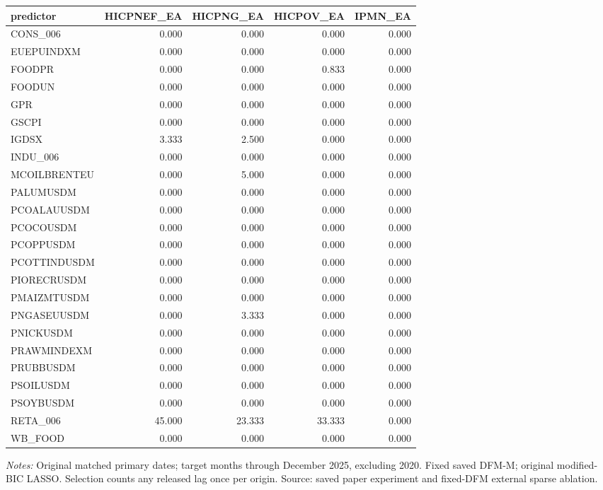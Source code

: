 \begin{threeparttable}
\begin{tabular}{lrrrr}
\toprule
predictor & HICPNEF\_EA & HICPNG\_EA & HICPOV\_EA & IPMN\_EA \\
\midrule
CONS\_006 & 0.000 & 0.000 & 0.000 & 0.000 \\
EUEPUINDXM & 0.000 & 0.000 & 0.000 & 0.000 \\
FOODPR & 0.000 & 0.000 & 0.833 & 0.000 \\
FOODUN & 0.000 & 0.000 & 0.000 & 0.000 \\
GPR & 0.000 & 0.000 & 0.000 & 0.000 \\
GSCPI & 0.000 & 0.000 & 0.000 & 0.000 \\
IGDSX & 3.333 & 2.500 & 0.000 & 0.000 \\
INDU\_006 & 0.000 & 0.000 & 0.000 & 0.000 \\
MCOILBRENTEU & 0.000 & 5.000 & 0.000 & 0.000 \\
PALUMUSDM & 0.000 & 0.000 & 0.000 & 0.000 \\
PCOALAUUSDM & 0.000 & 0.000 & 0.000 & 0.000 \\
PCOCOUSDM & 0.000 & 0.000 & 0.000 & 0.000 \\
PCOPPUSDM & 0.000 & 0.000 & 0.000 & 0.000 \\
PCOTTINDUSDM & 0.000 & 0.000 & 0.000 & 0.000 \\
PIORECRUSDM & 0.000 & 0.000 & 0.000 & 0.000 \\
PMAIZMTUSDM & 0.000 & 0.000 & 0.000 & 0.000 \\
PNGASEUUSDM & 0.000 & 3.333 & 0.000 & 0.000 \\
PNICKUSDM & 0.000 & 0.000 & 0.000 & 0.000 \\
PRAWMINDEXM & 0.000 & 0.000 & 0.000 & 0.000 \\
PRUBBUSDM & 0.000 & 0.000 & 0.000 & 0.000 \\
PSOILUSDM & 0.000 & 0.000 & 0.000 & 0.000 \\
PSOYBUSDM & 0.000 & 0.000 & 0.000 & 0.000 \\
RETA\_006 & 45.000 & 23.333 & 33.333 & 0.000 \\
WB\_FOOD & 0.000 & 0.000 & 0.000 & 0.000 \\
\bottomrule
\end{tabular}
\begin{tablenotes}[flushleft]\footnotesize
\item \textit{Notes:} Original matched primary dates; target months through December 2025, excluding 2020. Fixed saved DFM-M; original modified-BIC LASSO. Selection counts any released lag once per origin. Source: saved paper experiment and fixed-DFM external sparse ablation.
\end{tablenotes}
\end{threeparttable}
